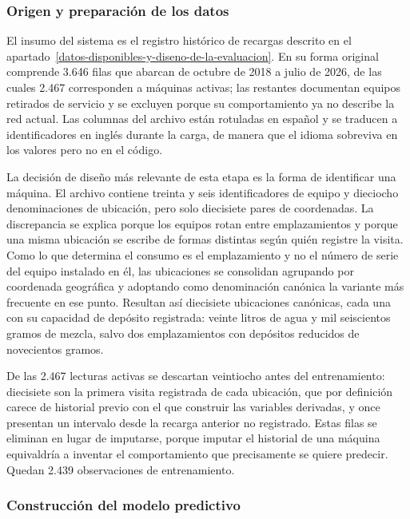 \subsubsection{Origen y preparación de los datos}\label{origen-y-preparacion-de-los-datos}

El insumo del sistema es el registro histórico de recargas descrito en el apartado~\ref{datos-disponibles-y-diseno-de-la-evaluacion}. En su forma original comprende 3.646 filas que abarcan de octubre de 2018 a julio de 2026, de las cuales 2.467 corresponden a máquinas activas; las restantes documentan equipos retirados de servicio y se excluyen porque su comportamiento ya no describe la red actual. Las columnas del archivo están rotuladas en español y se traducen a identificadores en inglés durante la carga, de manera que el idioma sobreviva en los valores pero no en el código.

La decisión de diseño más relevante de esta etapa es la forma de identificar una máquina. El archivo contiene treinta y seis identificadores de equipo y dieciocho denominaciones de ubicación, pero solo diecisiete pares de coordenadas. La discrepancia se explica porque los equipos rotan entre emplazamientos y porque una misma ubicación se escribe de formas distintas según quién registre la visita. Como lo que determina el consumo es el emplazamiento y no el número de serie del equipo instalado en él, las ubicaciones se consolidan agrupando por coordenada geográfica y adoptando como denominación canónica la variante más frecuente en ese punto. Resultan así diecisiete ubicaciones canónicas, cada una con su capacidad de depósito registrada: veinte litros de agua y mil seiscientos gramos de mezcla, salvo dos emplazamientos con depósitos reducidos de novecientos gramos.

De las 2.467 lecturas activas se descartan veintiocho antes del entrenamiento: diecisiete son la primera visita registrada de cada ubicación, que por definición carece de historial previo con el que construir las variables derivadas, y once presentan un intervalo desde la recarga anterior no registrado. Estas filas se eliminan en lugar de imputarse, porque imputar el historial de una máquina equivaldría a inventar el comportamiento que precisamente se quiere predecir. Quedan 2.439 observaciones de entrenamiento.

\subsubsection{Construcción del modelo predictivo}\label{construccion-del-modelo-predictivo}

